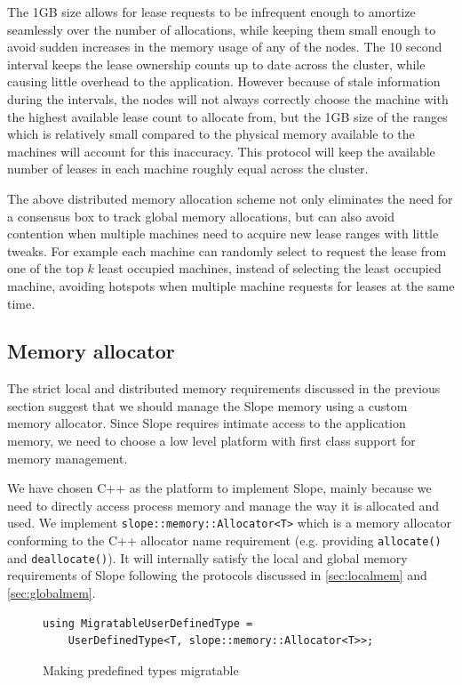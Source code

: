 The 1GB size allows for lease requests to be infrequent enough to amortize
seamlessly over the number of allocations, while keeping them small enough
to avoid sudden increases in the memory usage of any of the nodes. The 10
second interval keeps the lease ownership counts up to date across the cluster,
while causing little overhead to the application. However because of stale
information during the intervals, the nodes will not always
correctly choose the machine with the highest available lease count to allocate
from, but the 1GB size of the ranges which is relatively small compared to the
physical memory available to the machines will account for this inaccuracy.
This protocol
will keep the available number of leases in each machine roughly equal across
the cluster.

The above distributed memory allocation scheme not only eliminates the need for
a consensus box to track global memory allocations, but can also avoid
contention when multiple machines need to acquire new lease ranges with
little tweaks. For example each machine can randomly select to request the
lease from one of the top $k$ least occupied machines, instead of selecting
the least occupied machine, avoiding hotspots when multiple machine requests
for leases at the same time.

\subsection{Memory allocator}
\label{sec:platform}
The strict local and distributed memory requirements discussed in the previous
section suggest that we should manage the Slope memory using a custom memory
allocator. Since Slope requires intimate access to the application
memory, we need to choose a low level platform with first class support for
memory management.

We have chosen C++ as the platform to implement Slope, mainly because we need
to directly access process memory and manage the way it is allocated and used.
We implement \texttt{slope::memory::Allocator<T>} which is a memory allocator
conforming to the C++ allocator name requirement (e.g. providing
\texttt{allocate()} and \texttt{deallocate()}). It will internally satisfy the
local and global memory requirements of Slope following the protocols discussed
in \autoref{sec:localmem} and \autoref{sec:globalmem}.

\begin{figure}[t]
\begin{lstlisting}
using MigratableUserDefinedType =
    UserDefinedType<T, slope::memory::Allocator<T>>;
\end{lstlisting}
\caption{
    Making predefined types migratable
}
\label{fig:migratableuserdefined}
\end{figure}

